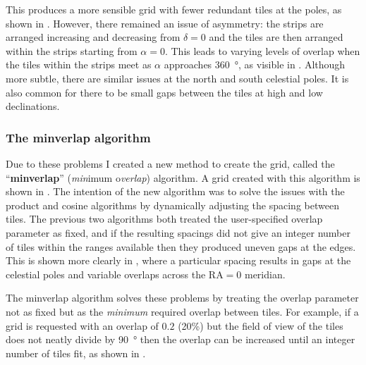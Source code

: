 \begin{colsection}
This produces a more sensible grid with fewer redundant tiles at the poles, as shown in . However, there remained an issue of asymmetry: the strips are arranged increasing and decreasing from $\delta=0$ and the tiles are then arranged within the strips starting from $\alpha=0$. This leads to varying levels of overlap when the tiles within the strips meet as $\alpha$ approaches \SI{360}{\degree}, as visible in . Although more subtle, there are similar issues at the north and south celestial poles. It is also common for there to be small gaps between the tiles at high and low declinations.

\subsubsection{The minverlap algorithm}

Due to these problems I created a new method to create the grid, called the ``\textbf{minverlap}'' (\emph{min}imum o\emph{verlap}) algorithm. A grid created with this algorithm is shown in . The intention of the new algorithm was to solve the issues with the product and cosine algorithms by dynamically adjusting the spacing between tiles. The previous two algorithms both treated the user-specified overlap parameter as fixed, and if the resulting spacings did not give an integer number of tiles within the ranges available then they produced uneven gaps at the edges. This is shown more clearly in , where a particular spacing results in gaps at the celestial poles and variable overlaps across the RA$=0$ meridian.

The minverlap algorithm solves these problems by treating the overlap parameter not as fixed but as the \textit{minimum} required overlap between tiles. For example, if a grid is requested with an overlap of $0.2$ (20\%) but the field of view of the tiles does not neatly divide by \SI{90}{\degree} then the overlap can be increased until an integer number of tiles fit, as shown in .

\newpage


\end{colsection}
